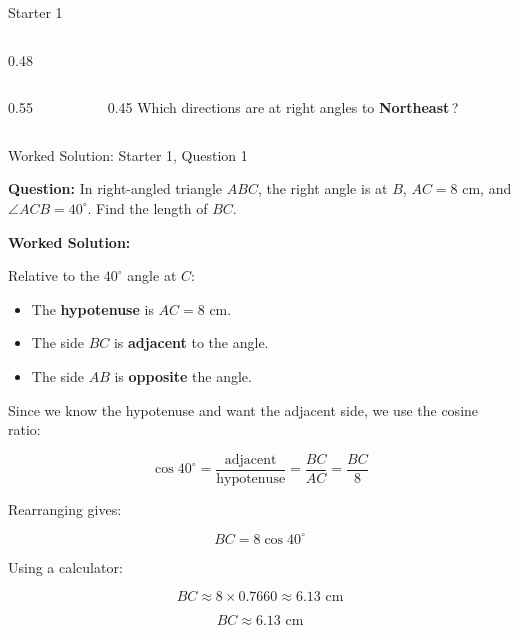 \documentclass[aspectratio=169,11pt]{beamer}
\begin{document}
\begin{frame}{Starter 1}
\begin{columns}[t]
\begin{column}{0.48\textwidth}
\begin{columns}[T,onlytextwidth]
\begin{column}{0.55\textwidth}
  \end{column}
  \begin{column}{0.45\textwidth}
    Which directions are at right angles to \textbf{Northeast}\,?
  \end{column}
\end{columns}

\end{column}
\end{columns}

\end{frame}

\begin{frame}{Worked Solution: Starter 1, Question 1}
\hypertarget{work-st1}{}

\textbf{Question:} In right-angled triangle \(ABC\), the right angle is at \(B\), \(AC = 8\text{ cm}\), and \(\angle ACB = 40^\circ\). Find the length of \(BC\).

\textbf{Worked Solution:}

Relative to the \(40^\circ\) angle at \(C\):
\begin{itemize}
\item The \textbf{hypotenuse} is \(AC = 8\text{ cm}\).
\item The side \(BC\) is \textbf{adjacent} to the angle.
\item The side \(AB\) is \textbf{opposite} the angle.
\end{itemize}

Since we know the hypotenuse and want the adjacent side, we use the cosine ratio:

\[
\cos 40^\circ = \frac{\text{adjacent}}{\text{hypotenuse}} = \frac{BC}{AC} = \frac{BC}{8}
\]

Rearranging gives:

\[
BC = 8\cos 40^\circ
\]

Using a calculator:

\[
BC \approx 8 \times 0.7660 \approx 6.13\text{ cm}
\]

\[
\boxed{BC \approx 6.13\text{ cm}}
\]

\end{frame}
\end{document}
